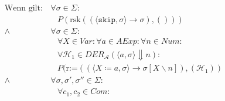 					\begin{align*}
						\text{Wenn gilt:} & \,\forall \sigma \in \Sigma : \tag{Zustände}                                                                                                                                                                                                              \\
						                  & \quad P(\text{rsk}((\langle \texttt{skip}, \sigma \rangle \rightarrow \sigma), ())) \tag{Konklusion}                                                                                                                                                      \\
						\land             & \,\forall \sigma \in \Sigma : \tag{Zustände}                                                                                                                                                                                                              \\
						                  & \quad \forall X \in \textit{Var} : \forall a \in \textit{AExp} : \forall n \in \textit{Num} : \tag{Ausdrucksbestandteile}                                                                                                                                 \\
						                  & \quad \forall \mathcal{H} _ 1 \in \textit{DER} _ \mathcal{A} (\langle a, \sigma \rangle \Downarrow n) : \tag{Kalkülfremde Herleitungen}                                                                                                                   \\
						                  & \quad P(\text{r:=}((\langle X \coloneqq a, \sigma \rangle \rightarrow \sigma[X \backslash n]), (\mathcal{H} _ 1)) \tag{Konklusion}                                                                                                                        \\
						\land             & \,\forall \sigma, \sigma', \sigma'' \in \Sigma : \tag{Zustände}                                                                                                                                                                                           \\
						                  & \quad \forall c _ 1, c _ 2 \in \textit{Com} : \tag{Ausdrucksbestandteile}                                                                                                                                                                                 \\

\end{align*}
